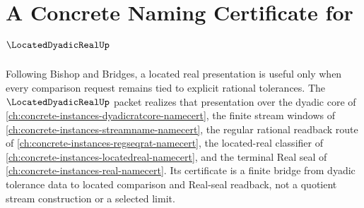 \chapter{A Concrete Naming Certificate for $\LocatedDyadicRealUp$}
\label{ch:concrete-instances-located-dyadic-real-namecert}

Following Bishop and Bridges, a located real presentation is useful only when every comparison request remains tied to explicit rational tolerances. The $\LocatedDyadicRealUp$ packet realizes that presentation over the dyadic core of \autoref{ch:concrete-instances-dyadicratcore-namecert}, the finite stream windows of \autoref{ch:concrete-instances-streamname-namecert}, the regular rational readback route of \autoref{ch:concrete-instances-regseqrat-namecert}, the located-real classifier of \autoref{ch:concrete-instances-locatedreal-namecert}, and the terminal Real seal of \autoref{ch:concrete-instances-real-namecert}. Its certificate is a finite bridge from dyadic tolerance data to located comparison and Real-seal readback, not a quotient stream construction or a selected limit.

